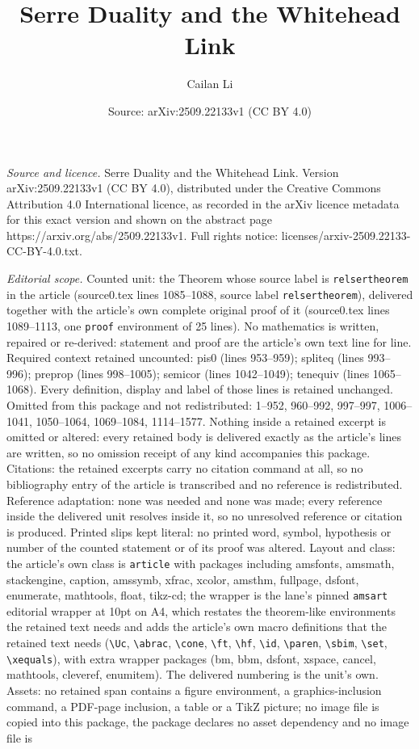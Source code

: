 \documentclass[10pt,a4paper]{amsart}
\title[Serre Duality and the Whitehead Link]{Serre Duality and the Whitehead Link}
\author{Cailan Li}
\date{Source: arXiv:2509.22133v1 (CC BY 4.0)}
\begin{document}
\maketitle

\noindent\emph{Source and licence.} Serre Duality and the Whitehead Link. Version arXiv:2509.22133v1 (CC BY 4.0), distributed under the Creative Commons Attribution 4.0 International licence, as recorded in the arXiv licence metadata for this exact version and shown on the abstract page https://arxiv.org/abs/2509.22133v1. Full rights notice: licenses/arxiv-2509.22133-CC-BY-4.0.txt.\par\smallskip

\noindent\textit{Editorial scope.} Counted unit: the Theorem whose source label is \texttt{relsertheorem} in the article (source0.tex lines 1085--1088, source label \texttt{relsertheorem}), delivered together with the article's own complete original proof of it (source0.tex lines 1089--1113, one \texttt{proof} environment of 25 lines). No mathematics is written, repaired or re-derived: statement and proof are the article's own text line for line. Required context retained uncounted: pis0 (lines 953--959); spliteq (lines 993--996); preprop (lines 998--1005); semicor (lines 1042--1049); tenequiv (lines 1065--1068). Every definition, display and label of those lines is retained unchanged. Omitted from this package and not redistributed: 1--952, 960--992, 997--997, 1006--1041, 1050--1064, 1069--1084, 1114--1577. Nothing inside a retained excerpt is omitted or altered: every retained body is delivered exactly as the article's lines are written, so no omission receipt of any kind accompanies this package. Citations: the retained excerpts carry no citation command at all, so no bibliography entry of the article is transcribed and no reference is redistributed. Reference adaptation: none was needed and none was made; every reference inside the delivered unit resolves inside it, so no unresolved reference or citation is produced. Printed slips kept literal: no printed word, symbol, hypothesis or number of the counted statement or of its proof was altered. Layout and class: the article's own class is \texttt{article} with packages including amsfonts, amsmath, stackengine, caption, amssymb, xfrac, xcolor, amsthm, fullpage, dsfont, enumerate, mathtools, float, tikz-cd; the wrapper is the lane's pinned \texttt{amsart} editorial wrapper at 10pt on A4, which restates the theorem-like environments the retained text needs and adds the article's own macro definitions that the retained text needs (\texttt{\textbackslash Uc}, \texttt{\textbackslash abrac}, \texttt{\textbackslash cone}, \texttt{\textbackslash ft}, \texttt{\textbackslash hf}, \texttt{\textbackslash id}, \texttt{\textbackslash paren}, \texttt{\textbackslash sbim}, \texttt{\textbackslash set}, \texttt{\textbackslash xequals}), with extra wrapper packages (bm, bbm, dsfont, xspace, cancel, mathtools, cleveref, enumitem). The delivered numbering is the unit's own. Assets: no retained span contains a figure environment, a graphics-inclusion command, a PDF-page inclusion, a table or a TikZ picture; no image file is copied into this package, the package declares no asset dependency and no image file is 
\end{document}
